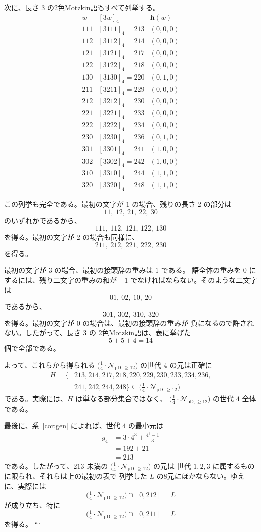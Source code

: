 \documentclass[12pt]{ltjsarticle}
\theoremstyle{plain}
\theoremstyle{definition}
\theoremstyle{plain}
\newcommand{\Pset}{%
  \bigl(\tfrac{1}{4}\cdot\mathcal{N}_{\mathrm{pD},\geq 12}\bigr)%
}
\begin{document}
次に、長さ $3$ の2色Motzkin語もすべて列挙する。
\[
\begin{array}{c|c|c}
 w&[3w]_4&\mathbf h(w)\\ \hline
111 &[3111]_4=213&(0,0,0)\\
112 &[3112]_4=214&(0,0,0)\\
121 &[3121]_4=217&(0,0,0)\\
122 &[3122]_4=218&(0,0,0)\\
130 &[3130]_4=220&(0,1,0)\\ \hline
211 &[3211]_4=229&(0,0,0)\\
212 &[3212]_4=230&(0,0,0)\\
221 &[3221]_4=233&(0,0,0)\\
222 &[3222]_4=234&(0,0,0)\\
230 &[3230]_4=236&(0,1,0)\\ \hline
301 &[3301]_4=241&(1,0,0)\\
302 &[3302]_4=242&(1,0,0)\\
310 &[3310]_4=244&(1,1,0)\\
320 &[3320]_4=248&(1,1,0)
\end{array}
\]

この列挙も完全である。最初の文字が $1$ の場合、残りの長さ
$2$ の部分は
\[
 11,\ 12,\ 21,\ 22,\ 30
\]
のいずれかであるから、
\[
 111,\ 112,\ 121,\ 122,\ 130
\]
を得る。最初の文字が $2$ の場合も同様に、
\[
 211,\ 212,\ 221,\ 222,\ 230
\]
を得る。

最初の文字が $3$ の場合、最初の接頭辞の重みは $1$ である。
語全体の重みを $0$ にするには、残り二文字の重みの和が
$-1$ でなければならない。そのような二文字は
\[
 01,\ 02,\ 10,\ 20
\]
であるから、
\[
 301,\ 302,\ 310,\ 320
\]
を得る。最初の文字が $0$ の場合は、最初の接頭辞の重みが
負になるので許されない。したがって、長さ $3$ の
2色Motzkin語は、表に挙げた
\[
 5+5+4=14
\]
個で全部である。

よって、これらから得られる $\Pset$ の世代 $4$ の元は正確に
\begin{equation}\label{eq:H-def}
\begin{split}
 H=\{&213,214,217,218,220,229,230,233,234,236,\\
     &241,242,244,248\}
 \subseteq\Pset
\end{split}
\end{equation}
である。実際には、$H$ は単なる部分集合ではなく、
$\Pset$ の世代 $4$ 全体である。

最後に、系~\ref{cor:gen} によれば、世代 $4$ の最小元は
\[
\begin{aligned}
 g_4
 &=3\cdot4^3+\frac{4^3-1}{3}\\
 &=192+21\\
 &=213
\end{aligned}
\]
である。したがって、$213$ 未満の $\Pset$ の元は
世代 $1,2,3$ に属するものに限られ、それらは上の最初の表で
列挙した $L$ の8元にほかならない。ゆえに、実際には
\[
 \Pset\cap[0,212]=L
\]
が成り立ち、特に
\begin{equation}\label{eq:P-small}
 \Pset\cap[0,211]=L
\end{equation}
を得る。
```
\end{document}
